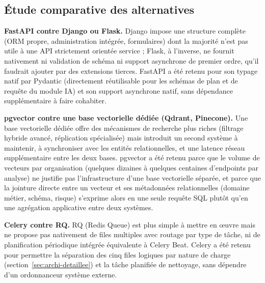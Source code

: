 \subsection{Étude comparative des alternatives}

\textbf{FastAPI contre Django ou Flask.} Django impose une structure complète (ORM propre, administration intégrée, formulaires) dont la majorité n'est pas utile à une API strictement orientée service ; Flask, à l'inverse, ne fournit nativement ni validation de schéma ni support asynchrone de premier ordre, qu'il faudrait ajouter par des extensions tierces. FastAPI a été retenu pour son typage natif par Pydantic (directement réutilisable pour les schémas de plan et de requête du module IA) et son support asynchrone natif, sans dépendance supplémentaire à faire cohabiter.

\textbf{pgvector contre une base vectorielle dédiée (Qdrant, Pinecone).} Une base vectorielle dédiée offre des mécanismes de recherche plus riches (filtrage hybride avancé, réplication spécialisée) mais introduit un second système à maintenir, à synchroniser avec les entités relationnelles, et une latence réseau supplémentaire entre les deux bases. pgvector a été retenu parce que le volume de vecteurs par organisation (quelques dizaines à quelques centaines d'endpoints par analyse) ne justifie pas l'infrastructure d'une base vectorielle séparée, et parce que la jointure directe entre un vecteur et ses métadonnées relationnelles (domaine métier, schéma, risque) s'exprime alors en une seule requête SQL plutôt qu'en une agrégation applicative entre deux systèmes.

\textbf{Celery contre RQ.} RQ (Redis Queue) est plus simple à mettre en œuvre mais ne propose pas nativement de files multiples avec routage par type de tâche, ni de planification périodique intégrée équivalente à Celery Beat. Celery a été retenu pour permettre la séparation des cinq files logiques par nature de charge (section~\ref{sec:archi-detaillee}) et la tâche planifiée de nettoyage, sans dépendre d'un ordonnanceur système externe.

